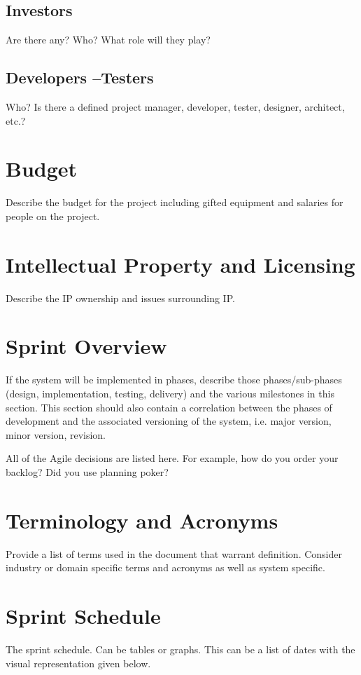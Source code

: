 \subsection{Investors}
Are there any?  Who?  What role will they play? 


\subsection{Developers --Testers}
Who?  Is there a defined project manager, developer, tester, designer, architect, 
etc.? 

\section{Budget}
Describe the budget for the project including gifted equipment and salaries for 
people on the project.

\section{Intellectual Property and Licensing}
Describe the IP ownership and issues surrounding IP.

\section{Sprint  Overview}
If the system will be implemented in phases, describe those phases/sub-phases (design, 
implementation, testing, delivery) and the various milestones in this section. 
 This section should also contain a correlation between the phases of development 
and the associated versioning of the system, i.e. major version, minor version, 
revision. 

All of the Agile decisions are listed here.  For example, how do you order your backlog?   
Did you use planning poker?   

\section{Terminology and Acronyms}
Provide a list of terms used in the document that warrant definition.  Consider 
industry or domain specific terms and acronyms as well as system specific. 

\section{Sprint Schedule}
The sprint schedule.  Can be tables or graphs.   This can be a list of dates with the visual 
representation given below.

